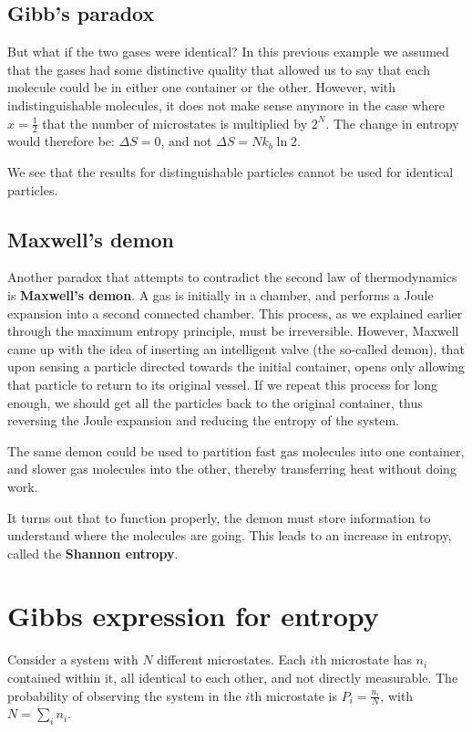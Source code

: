 \documentclass[a4paper,11pt,oneside]{book}
\begin{document}
\subsection{Gibb's paradox}
But what if the two gases were identical? In this previous example we assumed that the gases had some distinctive quality that allowed us to say that each molecule could be in either one container or the other. However, with indistinguishable molecules, it does not make sense anymore in the case where $x=\frac{1}{2}$ that the number of microstates is multiplied by $2^N$. The change in entropy would therefore be: $\Delta S = 0$, and not $\Delta S = N k_b \ln 2$. 


We see that the results for distinguishable particles cannot be used for identical particles. 

\subsection{Maxwell's demon}
Another paradox that attempts to contradict the second law of thermodynamics is \textbf{Maxwell's demon}. A gas is initially in a chamber, and performs a Joule expansion into a second connected chamber. This process, as we explained earlier through the maximum entropy principle, must be irreversible. However, Maxwell came up with the idea of inserting an intelligent valve (the so-called demon), that upon sensing a particle directed towards the initial container, opens only allowing that particle to return to its original vessel. If we repeat this process for long enough, we should get all the particles back to the original container, thus reversing the Joule expansion and reducing the entropy of the system. 


The same demon could be used to partition fast gas molecules into one container, and slower gas molecules into the other, thereby transferring heat without doing work. 


It turns out that to function properly, the demon must store information to understand where the molecules are going. This leads to an increase in entropy, called the \textbf{Shannon entropy}.

\section{Gibbs expression for entropy}
Consider a system with $N$ different microstates. Each $i$th microstate has $n_i$ contained within it, all identical to each other, and not directly measurable. The probability of observing the system in the $i$th microstate is $P_i =  \frac{n_i}{N}$, with $N = \sum_i n_i$. 
\end{document}
